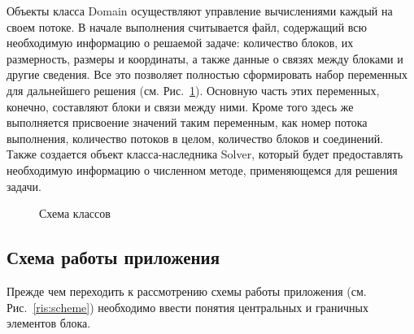 \documentclass[a4paper, 14pt]{extarticle}
\theoremstyle{definition}
\begin{document}
\par Объекты класса Domain осуществляют управление вычислениями каждый на своем потоке. В начале выполнения считывается файл, содержащий всю необходимую информацию о решаемой задаче: количество блоков, их размерность, размеры и координаты, а также данные о связях между блоками и другие сведения. Все это позволяет полностью сформировать набор переменных для дальнейшего решения (см. Рис.~\ref{ris:all}). Основную часть этих переменных, конечно, составляют блоки и связи между ними. Кроме того здесь же выполняется присвоение значений таким переменным, как номер потока выполнения, количество потоков в целом, количество блоков и соединений. Также создается объект класса-наследника Solver, который будет предоставлять необходимую информацию о численном методе, применяющемся для решения задачи.
\begin{figure}[h]
	\caption{Схема классов}
	\label{ris:all}
\end{figure}

\subsection{Схема работы приложения}

\par Прежде чем переходить к рассмотрению схемы работы приложения (см. Рис.~\ref{ris:scheme}) необходимо ввести понятия центральных и граничных элементов блока.
\end{document}
